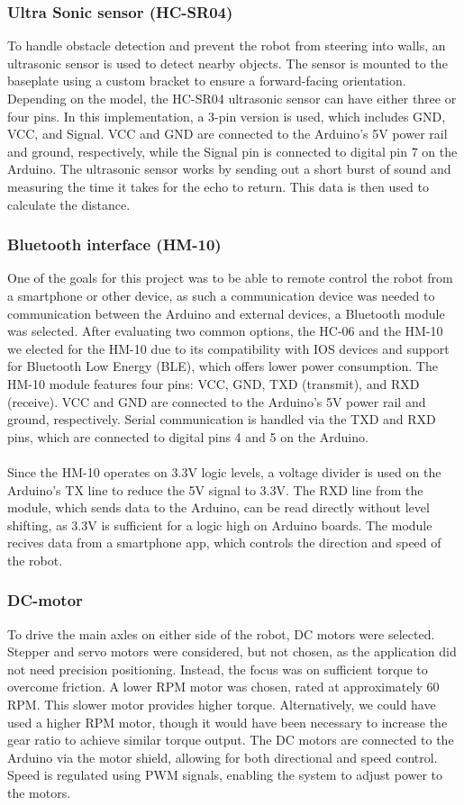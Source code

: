 \subsubsection{Ultra Sonic sensor (HC-SR04)}
To handle obstacle detection and prevent the robot from steering into walls, an ultrasonic sensor is used to detect nearby objects. The sensor is mounted to the baseplate using a custom bracket to ensure a forward-facing orientation. Depending on the model, the HC-SR04 ultrasonic sensor can have either three or four pins. In this implementation, a 3-pin version is used, which includes GND, VCC, and Signal. VCC and GND are connected to the Arduino’s 5V power rail and ground, respectively, while the Signal pin is connected to digital pin 7 on the Arduino. The ultrasonic sensor works by sending out a short burst of sound and measuring the time it takes for the echo to return. This data is then used to calculate the distance. 
\\
\subsubsection{Bluetooth interface (HM-10)}
One of the goals for this project was to be able to remote control the robot from a smartphone or other device, as such a communication device was needed to communication between the Arduino and external devices, a Bluetooth module was selected. After evaluating two common options, the HC-06 and the HM-10 we elected for the HM-10 due to its compatibility with IOS devices and support for Bluetooth Low Energy (BLE), which offers lower power consumption. The HM-10 module features four pins: VCC, GND, TXD (transmit), and RXD (receive). VCC and GND are connected to the Arduino’s 5V power rail and ground, respectively. Serial communication is handled via the TXD and RXD pins, which are connected to digital pins 4 and 5 on the Arduino.
\\ \\
Since the HM-10 operates on 3.3V logic levels, a voltage divider is used on the Arduino’s TX line to reduce the 5V signal to 3.3V. The RXD line from the module, which sends data to the Arduino, can be read directly without level shifting, as 3.3V is sufficient for a logic high on Arduino boards. The module recives data from a smartphone app, which controls the direction and speed of the robot.
\\
\subsubsection{DC-motor}
To drive the main axles on either side of the robot, DC motors were selected. Stepper and servo motors were considered, but not chosen, as the application did not need precision positioning. Instead, the focus was on sufficient torque to overcome friction. A lower RPM motor was chosen, rated at approximately 60 RPM. This slower motor provides higher torque. Alternatively, we could have used a higher RPM motor, though it would have been necessary to increase the gear ratio to achieve similar torque output. The DC motors are connected to the Arduino via the motor shield, allowing for both directional and speed control. Speed is regulated using PWM signals, enabling the system to adjust power to the motors.
\\
